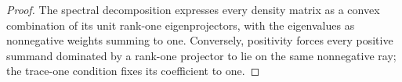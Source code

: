 \begin{proof}\leanok
    The spectral decomposition expresses every density matrix as a convex
    combination of its unit rank-one eigenprojectors, with the eigenvalues as
    nonnegative weights summing to one. Conversely, positivity forces every
    positive summand dominated by a rank-one projector to lie on the same
    nonnegative ray; the trace-one condition fixes its coefficient to one.
\end{proof}
